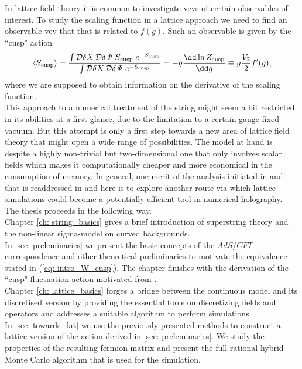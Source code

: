 %
%
In lattice field theory it is common to investigate vevs of certain observables of interest. To study the scaling function in a lattice approach we need to find an observable vev that that is related to $f(g)$. Such an observable is given by the ``cusp" action
%
%
\begin{equation}
\langle S_{\rm cusp} \rangle = \frac{\int \mathcal{D}\delta X\,\mathcal{D}\delta\mathit{\Psi} \; S_{\rm cusp} \;e^{-S_{\rm cusp}}}{\int \mathcal{D}\delta X\,\mathcal{D}\delta\mathit{\Psi} \; e^{-S_{\rm cusp}}} = -g \frac{\dd \ln Z_{\rm cusp}}{\dd g} \equiv g\frac{V_{2}}{2} f'(g),
\end{equation}
%
%
where we are supposed to obtain information on the derivative of the scaling function.\\
This approach to a numerical treatment of the  string might seem a bit restricted in its abilities at a first glance, due to the limitation to a certain gauge fixed vacuum. But this attempt is only a first step towards a new area of lattice field theory that might open a wide range of possibilities. The model at hand is despite a highly non-trivial but two-dimensional one that only involves scalar fields which makes it computationally cheaper and more economical in the consumption of memory. In general, one merit of the analysis initiated in \cite{Roiban} and that is readdressed in \cite{Bianchi:2016cyv,Forini:2016sot} and here is to explore another route via which lattice simulations could become a potentially efficient tool in numerical holography.\\[0.5cm]
%
%
The thesis proceeds in the following way.\\
%
Chapter \ref{ch: string_basics} gives a brief introduction of superstring theory and the non-linear sigma-model on curved backgrounds.\\
%
In \autoref{sec: preleminaries} we present the basic concepts of the $AdS/CFT$ correspondence and other theoretical preliminaries to motivate the equivalence stated in (\ref{eq: intro_W_cusp}). The chapter finishes with the derivation of the ``cusp" fluctuation action motivated from \cite{Metsaev:2000yu,Metsaev:2000yf,Giombi:2009gd}.\\
%
Chapter \ref{ch: lattice_basics} forges a bridge between the continuous model and its discretised version by providing the essential tools on discretizing fields and operators and addresses a suitable algorithm to perform simulations.\\
%
In \autoref{sec: towards_lat} we use the previously presented methods to construct a lattice version of the action derived in \autoref{sec: preleminaries}. We study the properties of the resulting fermion matrix and present the full rational hybrid Monte Carlo algorithm that is used for the simulation.\\
